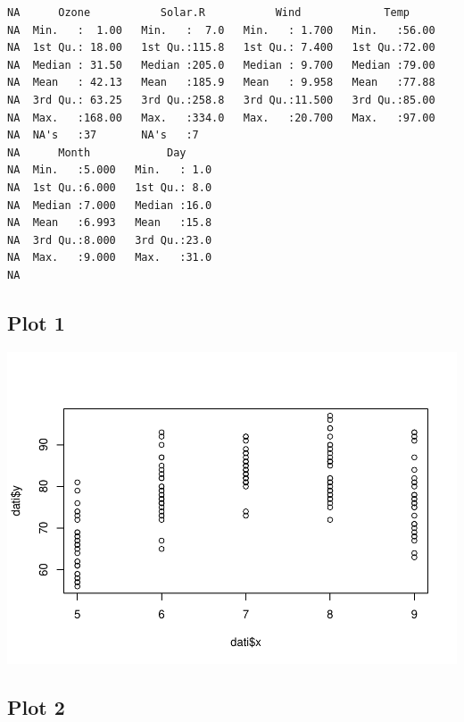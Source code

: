 \documentclass[
]{article}
\newenvironment{Shaded}{\begin{snugshade}}{\end{snugshade}}
\newcommand{\FunctionTok}[1]{\textcolor[rgb]{0.13,0.29,0.53}{\textbf{#1}}}
\newcommand{\NormalTok}[1]{#1}
\newcommand{\SpecialCharTok}[1]{\textcolor[rgb]{0.81,0.36,0.00}{\textbf{#1}}}
\begin{document}
\begin{verbatim}
NA      Ozone           Solar.R           Wind             Temp      
NA  Min.   :  1.00   Min.   :  7.0   Min.   : 1.700   Min.   :56.00  
NA  1st Qu.: 18.00   1st Qu.:115.8   1st Qu.: 7.400   1st Qu.:72.00  
NA  Median : 31.50   Median :205.0   Median : 9.700   Median :79.00  
NA  Mean   : 42.13   Mean   :185.9   Mean   : 9.958   Mean   :77.88  
NA  3rd Qu.: 63.25   3rd Qu.:258.8   3rd Qu.:11.500   3rd Qu.:85.00  
NA  Max.   :168.00   Max.   :334.0   Max.   :20.700   Max.   :97.00  
NA  NA's   :37       NA's   :7                                       
NA      Month            Day      
NA  Min.   :5.000   Min.   : 1.0  
NA  1st Qu.:6.000   1st Qu.: 8.0  
NA  Median :7.000   Median :16.0  
NA  Mean   :6.993   Mean   :15.8  
NA  3rd Qu.:8.000   3rd Qu.:23.0  
NA  Max.   :9.000   Max.   :31.0  
NA 
\end{verbatim}

\hypertarget{plot-1}{%
\subsection{Plot 1}\label{plot-1}}

\begin{center}\includegraphics[width=0.5\linewidth]{Airquality2_files/figure-latex/unnamed-chunk-6-1} \end{center}

\hypertarget{plot-2}{%
\subsection{Plot 2}\label{plot-2}}

\begin{Shaded}
\end{Shaded}
\end{document}
